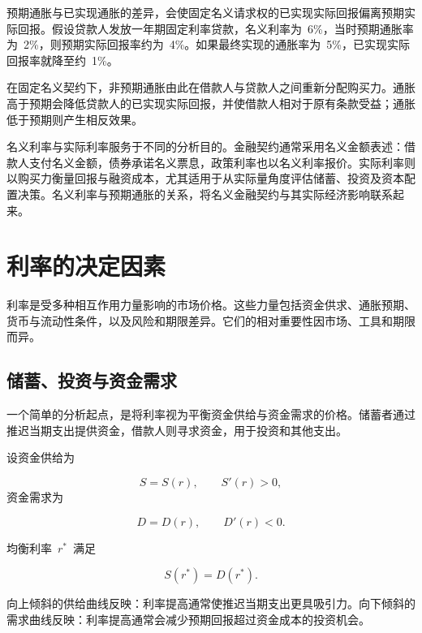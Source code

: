 预期通胀与已实现通胀的差异，会使固定名义请求权的已实现实际回报偏离预期实际回报。假设贷款人发放一年期固定利率贷款，名义利率为~6\%，当时预期通胀率为~2\%，则预期实际回报率约为~4\%。如果最终实现的通胀率为~5\%，已实现实际回报率就降至约~1\%。

在固定名义契约下，非预期通胀由此在借款人与贷款人之间重新分配购买力。通胀高于预期会降低贷款人的已实现实际回报，并使借款人相对于原有条款受益；通胀低于预期则产生相反效果。

名义利率与实际利率服务于不同的分析目的。金融契约通常采用名义金额表述：借款人支付名义金额，债券承诺名义票息，政策利率也以名义利率报价。实际利率则以购买力衡量回报与融资成本，尤其适用于从实际量角度评估储蓄、投资及资本配置决策。名义利率与预期通胀的关系，将名义金融契约与其实际经济影响联系起来。

\section{利率的决定因素}

利率是受多种相互作用力量影响的市场价格。这些力量包括资金供求、通胀预期、货币与流动性条件，以及风险和期限差异。它们的相对重要性因市场、工具和期限而异。

\subsection{储蓄、投资与资金需求}

一个简单的分析起点，是将利率视为平衡资金供给与资金需求的价格。储蓄者通过推迟当期支出提供资金，借款人则寻求资金，用于投资和其他支出。

设资金供给为

\begin{equation}
S=S(r),
\qquad
S'(r)>0,
\label{eq:ch6-saving-supply}
\end{equation}
资金需求为

\begin{equation}
D=D(r),
\qquad
D'(r)<0.
\label{eq:ch6-investment-demand}
\end{equation}

均衡利率~$r^{*}$~满足

\begin{equation}
S(r^{*})=D(r^{*}).
\label{eq:ch6-funds-equilibrium}
\end{equation}

向上倾斜的供给曲线反映：利率提高通常使推迟当期支出更具吸引力。向下倾斜的需求曲线反映：利率提高通常会减少预期回报超过资金成本的投资机会。

